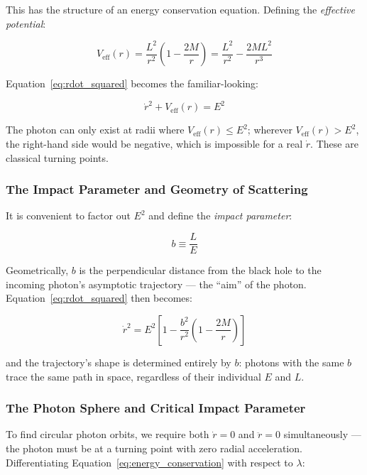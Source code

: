 \documentclass[12pt,a4paper]{article}
\begin{document}
This has the structure of an energy conservation equation. Defining the \textit{effective potential}:

\begin{equation}
    V_\text{eff}(r) = \frac{L^2}{r^2}\left(1 - \frac{2M}{r}\right)
    = \frac{L^2}{r^2} - \frac{2ML^2}{r^3}
    \label{eq:veff}
\end{equation}

Equation~\eqref{eq:rdot_squared} becomes the familiar-looking:

\begin{equation}
    \dot{r}^2 + V_\text{eff}(r) = E^2
    \label{eq:energy_conservation}
\end{equation}

The photon can only exist at radii where $V_\text{eff}(r) \leq E^2$; wherever $V_\text{eff}(r) > E^2$, the right-hand side would be negative, which is impossible for a real $\dot{r}$. These are classical turning points.

\subsubsection{The Impact Parameter and Geometry of Scattering}
It is convenient to factor out $E^2$ and define the \textit{impact parameter}:

\begin{equation}
    b \equiv \frac{L}{E}
    \label{eq:impact_parameter}
\end{equation}

Geometrically, $b$ is the perpendicular distance from the black hole to the incoming photon's asymptotic trajectory — the ``aim'' of the photon. Equation~\eqref{eq:rdot_squared} then becomes:

\begin{equation}
    \dot{r}^2 = E^2\left[1 - \frac{b^2}{r^2}\left(1 - \frac{2M}{r}\right)\right]
    \label{eq:rdot_b}
\end{equation}

and the trajectory's shape is determined entirely by $b$: photons with the same $b$ trace the same path in space, regardless of their individual $E$ and $L$.

\subsubsection{The Photon Sphere and Critical Impact Parameter}
To find circular photon orbits, we require both $\dot{r} = 0$ and $\ddot{r} = 0$ simultaneously — the photon must be at a turning point with zero radial acceleration. Differentiating Equation~\eqref{eq:energy_conservation} with respect to $\lambda$:
\end{document}
